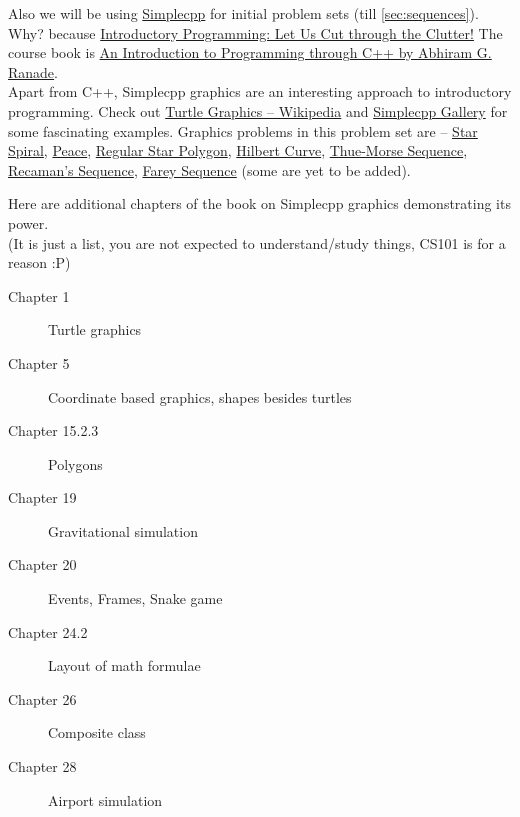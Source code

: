 Also we will be using \href{https://www.cse.iitb.ac.in/~ranade/simplecpp/}{Simplecpp} for initial problem sets (till \ref{sec:sequences}).
Why? because \href{https://www.cse.iitb.ac.in/~ranade/iticse16.pdf}{Introductory Programming: Let Us Cut through the Clutter!} The course book is \href{https://www.cse.iitb.ac.in/~ranade/book.html}{An Introduction to Programming through C++ by Abhiram G. Ranade}.\\
Apart from C++, Simplecpp graphics are an interesting approach to introductory programming. Check out \href{https://en.wikipedia.org/wiki/Turtle_graphics}{Turtle Graphics -- Wikipedia} and \href{https://www.cse.iitb.ac.in/~ranade/simplecpp/gallery.html}{Simplecpp Gallery} for some fascinating examples. Graphics problems in this problem set are -- \hyperref[pp:starspiral]{Star Spiral}, \hyperref[pp:peace]{Peace}, \hyperref[pp:regularstarpolygon]{Regular Star Polygon}, \hyperref[pp:hilbertcurve]{Hilbert Curve}, \hyperref[pp:thuemorsesequence]{Thue-Morse Sequence}, \hyperref[pp:recamanssequence]{Recaman's Sequence}, \hyperref[pp:fareysequence]{Farey Sequence} (some are yet to be added).

Here are additional chapters of the book on Simplecpp graphics demonstrating its power.\\
(It is just a list, you are not expected to understand/study things, CS101 is for a reason :P)
\begin{description}
	\item[Chapter 1] Turtle graphics
	\item[Chapter 5] Coordinate based graphics, shapes besides turtles
	\item[Chapter 15.2.3] Polygons
	\item[Chapter 19] Gravitational simulation
	\item[Chapter 20] Events, Frames, Snake game
	\item[Chapter 24.2] Layout of math formulae
	\item[Chapter 26] Composite class
	\item[Chapter 28] Airport simulation
\end{description}